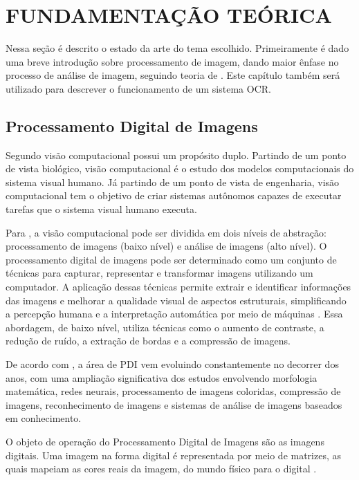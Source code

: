 
\chapter{FUNDAMENTAÇÃO TEÓRICA} \label{cap:funda}

Nessa seção é descrito o estado da arte do tema escolhido. Primeiramente é dado uma breve introdução sobre processamento de imagem, dando maior ênfase no processo de análise de imagem, seguindo teoria de . Este capítulo também será utilizado para descrever o funcionamento de um sistema OCR.

\section{Processamento Digital de Imagens}


Segundo  visão computacional possui um propósito duplo. Partindo de um ponto de vista biológico, visão computacional é o estudo dos modelos computacionais do sistema visual humano. Já partindo de um ponto de vista de engenharia, visão computacional tem o objetivo de criar sistemas autônomos capazes de executar tarefas que o sistema visual humano executa.


Para , a visão computacional pode ser dividida em dois níveis de abstração: processamento de imagens (baixo nível) e análise de imagens (alto nível). O processamento digital de imagens pode ser determinado como um conjunto de técnicas para capturar, representar e transformar imagens utilizando um computador. A aplicação dessas técnicas permite extrair e identificar informações das imagens e melhorar a qualidade visual de aspectos estruturais, simplificando a percepção humana e a interpretação automática por meio de máquinas \cite{PEDRINI2008}. Essa abordagem, de baixo nível, utiliza técnicas como o aumento de contraste, a redução de ruído, a extração de bordas e a compressão de imagens.

De acordo com , a área de PDI vem evoluindo constantemente no decorrer dos anos, com uma ampliação significativa dos estudos envolvendo morfologia matemática, redes neurais, processamento de imagens coloridas, compressão de imagens, reconhecimento de imagens e sistemas de análise de imagens baseados em conhecimento.


O objeto de operação do Processamento Digital de Imagens são as imagens digitais. Uma imagem na forma digital é representada por meio de matrizes, as quais mapeiam as cores reais da imagem, do mundo físico para o digital \cite{Almeida2018}.





